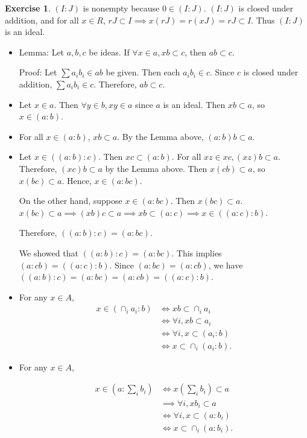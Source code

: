 \documentclass[12pt, psamsfonts]{amsart}
\theoremstyle{definition}
\newtheorem*{exer}{Exercise}
\theoremstyle{remark}
\numberwithin{equation}{section}
\begin{document}
\begin{exer}{3}
  $(I:J)$ is nonempty because $0 \in (I:J)$.
  $(I:J)$ is closed under addition, and for all $x \in R$, $rJ \subset I \implies x(rJ) = r(xJ) = rJ \subset I$.
  Thus $(I:J)$ is an ideal.

  \begin{itemize}
    \item
      Lemma:
      Let $a, b, c$ be ideas.
      If $\forall x \in a, xb \subset c$, then $ab \subset c$.

      Proof:
      Let $\sum a_ib_i \in ab$ be given.
      Then each $a_ib_i \in c$.
      Since $c$ is closed under addition, $\sum a_ib_i \in c$.
      Therefore, $ab \subset c$.
    \item
      Let $x \in a$.
      Then $\forall y \in b, xy \in a$ since $a$ is an ideal.
      Then $xb \subset a$, so $x \in (a:b)$.
    \item
      For all $x \in (a:b)$, $xb \subset a$.
      By the Lemma above, $(a:b)b \subset a$.
    \item
      Let $x \in ((a:b):c)$.
      Then $xc \subset (a:b)$.
      For all $xz \in xc, (xz)b \subset a$.
      Therefore, $(xc)b \subset a$ by the Lemma above.
      Then $x(cb) \subset a$, so $x(bc) \subset a$.
      Hence, $x \in (a:bc)$.

      On the other hand, suppose $x \in (a:bc)$.
      Then $x(bc) \subset a$.
      $x(bc) \subset a \implies (xb)c \subset a \implies xb \subset (a:c) \implies x \in ((a:c):b)$.

      Therefore, $((a:b):c) = (a:bc)$.

      We showed that $((a:b):c) = (a:bc)$.
      This implies $(a:cb) = ((a:c):b)$.
      Since $(a:bc) = (a:cb)$, we have $((a:b):c) = (a:bc) = (a:cb) = ((a:c):b)$.
    \item
      For any $x \in A$,
      \begin{align*}
        x \in (\cap_i a_i:b)
          &\iff xb \subset \cap_i a_i \\
          &\iff \forall i, xb \subset a_i \\
          &\iff \forall i, x \subset (a_i:b) \\
          &\iff x \subset \cap_i (a_i:b).
      \end{align*}
    \item
      For any $x \in A$,

      $$
      \begin{align*}
        x \in (a:\sum_i b_i)
          &\iff x(\sum_i b_i) \subset a \\
          &\implies \forall i, xb_i \subset a \\
          &\iff \forall i, x \subset (a:b_i) \\
          &\iff x \subset \cap_i(a:b_i).
      \end{align*}
      $$


\end{itemize}
\end{exer}
\end{document}
